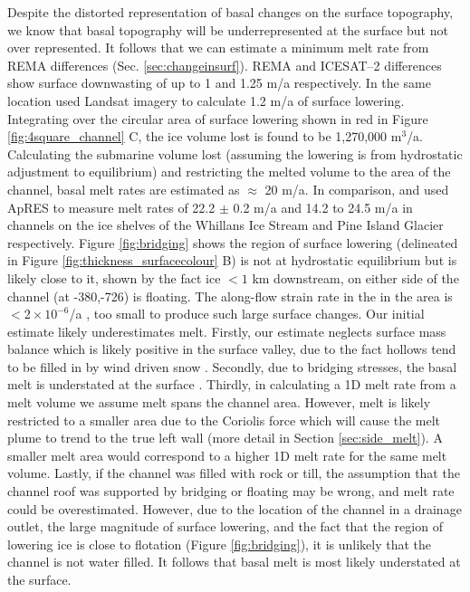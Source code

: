 Despite the distorted representation of basal changes on the surface topography, we know that basal topography will be underrepresented at the surface but not over represented. It follows that we can estimate a minimum melt rate from REMA differences (Sec. \ref{sec:changeinsurf}). REMA and ICESAT--2 differences show surface downwasting of up to 1 and 1.25 m/a respectively. In the same location \cite{kim2016active} used Landsat imagery to calculate 1.2 m/a of surface lowering.
Integrating over the circular area of surface lowering shown in red in Figure \ref{fig:4square_channel} C, the ice volume lost is found to be 1,270,000 $\mathrm{m}^3$/a. Calculating the submarine volume lost (assuming the lowering is from hydrostatic adjustment to equilibrium) and restricting the melted volume to the area of the channel, basal melt rates are estimated as $\approx$ 20 m/a. In comparison, \cite{marsh2016high} and \cite{stanton2013channelized} used ApRES to measure melt rates of 22.2 $\pm$ 0.2 m/a and 14.2 to 24.5 m/a in channels on the ice shelves of the Whillans Ice Stream and Pine Island Glacier respectively. 
Figure \ref{fig:bridging} shows the region of surface lowering (delineated in Figure \ref{fig:thickness_surfacecolour} B) is not at hydrostatic equilibrium but is likely close to it, shown by the fact ice $<1$ km downstream, on either side of the channel  (at -380,-726) is floating. 
The along-flow strain rate in the in the area is $< 2 \times 10 ^{-6}$/a \citep{alley2018continent}, too small to produce such large surface changes. 
Our initial estimate likely underestimates melt. Firstly, our estimate neglects surface mass balance which is likely positive in the surface valley, due to the fact hollows tend to be filled in by wind driven snow \cite [e.g.][] {gow1965relationship}. Secondly, due to bridging stresses, the basal melt is understated at the surface \citep{drews2015evolution}.  Thirdly, in calculating a 1D melt rate from a melt volume we assume melt spans the channel area. However, melt is likely restricted to a smaller area due to the Coriolis force which will cause the melt plume to trend to the true left wall (more detail in Section \ref{sec:side_melt}). A smaller melt area would correspond to a higher 1D melt rate for the same melt volume.  
Lastly, if the channel was filled with rock or till, the assumption that the channel roof was supported by bridging or floating may be wrong, and melt rate could be overestimated. However, due to the location of the channel in a drainage outlet, the large magnitude of surface lowering, and the fact that the region of lowering ice is close to flotation (Figure \ref{fig:bridging}), it is unlikely that the channel is not water filled. It follows that basal melt is most likely understated at the surface.



